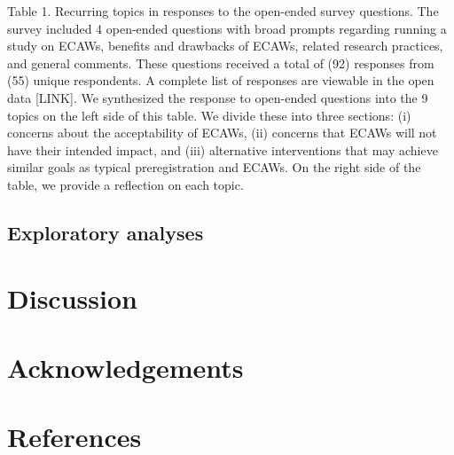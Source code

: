 \documentclass[
  man,floatsintext]{apa6}
\newlength{\cslhangindent}
\newlength{\cslentryspacingunit} %
\newenvironment{CSLReferences}[2] %
 {%
  \setlength{\parindent}{0pt}
  \ifodd #1
  \let\oldpar\par
  \def\par{\hangindent=\cslhangindent\oldpar}
  \fi
  \setlength{\parskip}{#2\cslentryspacingunit}
 }%
 {}
\begin{document}
Table 1. Recurring topics in responses to the open-ended survey questions. The survey included 4 open-ended questions with broad prompts regarding running a study on ECAWs, benefits and drawbacks of ECAWs, related research practices, and general comments. These questions received a total of (92) responses from (55) unique respondents. A complete list of responses are viewable in the open data {[}LINK{]}. We synthesized the response to open-ended questions into the 9 topics on the left side of this table. We divide these into three sections: (i) concerns about the acceptability of ECAWs, (ii) concerns that ECAWs will not have their intended impact, and (iii) alternative interventions that may achieve similar goals as typical preregistration and ECAWs. On the right side of the table, we provide a reflection on each topic.

\hypertarget{exploratory-analyses}{%
\subsection{Exploratory analyses}\label{exploratory-analyses}}

\hypertarget{discussion}{%
\section{Discussion}\label{discussion}}

\hypertarget{acknowledgements}{%
\section{Acknowledgements}\label{acknowledgements}}

\newpage

\hypertarget{references}{%
\section{References}\label{references}}

\hypertarget{refs}{}
\begin{CSLReferences}{0}{0}
\end{CSLReferences}

\newpage

\hypertarget{appendix-appendix}{%
\appendix}
\end{document}
